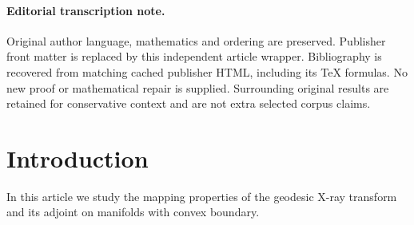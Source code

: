\documentclass[11pt]{article}
\theoremstyle{plain}
\theoremstyle{definition}
\theoremstyle{remark}
\begin{document}
\paragraph{Editorial transcription note.}
Original author language, mathematics and ordering are preserved. Publisher front matter is replaced by this independent article wrapper. Bibliography is recovered from matching cached publisher HTML, including its TeX formulas. No new proof or mathematical repair is supplied. Surrounding original results are retained for conservative context and are not extra selected corpus claims.
\clearpage

\section{Introduction}\label{sec:intro}
In this article we study the mapping properties of the geodesic X-ray transform and its adjoint on manifolds with convex boundary.
\end{document}
